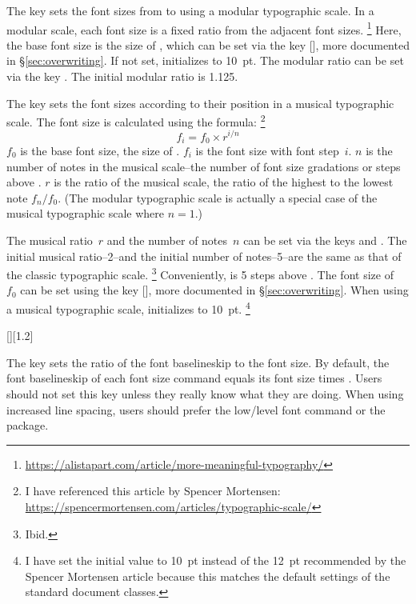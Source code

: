 \documentclass{beery}
\begin{document}
The key  sets the font sizes from  to  using a modular typographic scale.
In a modular scale, each font size is a fixed ratio from the adjacent font sizes.%
\footnote{\url{https://alistapart.com/article/more-meaningful-typography/}}
Here, the base font size is the size of , which can be set via the key [], more documented in \S\ref{sec:overwriting}.
If not set,  initializes to \qty{10}{pt}.
The modular ratio can be set via the key .
The initial modular ratio is \num{1.125}.



The key  sets the font sizes according to their position in a musical typographic scale.
The font size is calculated using the formula:%
\footnote
  {%
    I have referenced this article by Spencer Mortensen:
    \newline
    \url{https://spencermortensen.com/articles/typographic-scale/}%
  }
\[ f_i = f_0 \times r ^ { i / n } \]
$f_0$ is the base font size, the size of .
$f_i$ is the font size with font step~$i$.
$n$ is the number of notes in the musical scale\---the number of font size gradations or steps above .
$r$ is the ratio of the musical scale, the ratio of the highest to the lowest note $ f_n / f_0 $.
(The modular typographic scale is actually a special case of the musical typographic scale where $n=1$.)

The musical ratio~$r$ and the number of notes~$n$ can be set via the keys  and .
The initial musical ratio\---\num{2}\---and the initial number of notes\---\num{5}\---are the same as that of the classic typographic scale.%
\footnote{Ibid.}
Conveniently,  is \num{5} steps above .
The font size of ~$f_0$ can be set using the key [], more documented in \S\ref{sec:overwriting}.
When using a musical typographic scale,  initializes to \qty{10}{pt}.%
\footnote {I have set the initial value to \qty{10}{pt} instead of the \qty{12}{pt} recommended by the Spencer Mortensen article because this matches the default settings of the standard \LaTeXe{} document classes.}

[][1.2]
\KeepNextPar*

The key  sets the ratio of the font baselineskip to the font size.
By default, the font baselineskip of each font size command equals its font size times .
Users should not set this key unless they really know what they are doing.
When using increased line spacing, users should prefer the low\-/level font command  or the  package.
\end{document}

